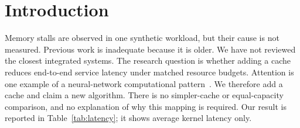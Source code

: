 \section{Introduction}\label{sec:intro}
Memory stalls are observed in one synthetic workload, but their cause is not measured.
Previous work is inadequate because it is older. We have not reviewed the closest integrated systems.
The research question is whether adding a cache reduces end-to-end service latency under matched resource budgets.
Attention is one example of a neural-network computational pattern~\cite{vaswani2017}.
We therefore add a cache and claim a new algorithm.
There is no simpler-cache or equal-capacity comparison, and no explanation of why this mapping is required.
Our result is reported in Table~\ref{tab:latency}; it shows average kernel latency only.
